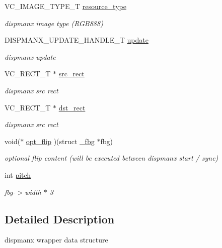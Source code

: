 \begin{DoxyCompactItemize}
V\+C\+\_\+\+I\+M\+A\+G\+E\+\_\+\+T\+Y\+P\+E\+\_\+T \hyperlink{struct__fbg__dispmanx__context_a88cb809e4e2653c6925824ebd5a66149}{resource\+\_\+type}
\begin{DoxyCompactList}\small\item\em dispmanx image type (R\+G\+B888) \end{DoxyCompactList}\item 
D\+I\+S\+P\+M\+A\+N\+X\+\_\+\+U\+P\+D\+A\+T\+E\+\_\+\+H\+A\+N\+D\+L\+E\+\_\+T \hyperlink{struct__fbg__dispmanx__context_a583202df9f959780bc21e9e5ce824f34}{update}
\begin{DoxyCompactList}\small\item\em dispmanx update \end{DoxyCompactList}\item 
V\+C\+\_\+\+R\+E\+C\+T\+\_\+T $\ast$ \hyperlink{struct__fbg__dispmanx__context_aef1016d77620bbfd67bf090fd2f08e19}{src\+\_\+rect}
\begin{DoxyCompactList}\small\item\em dispmanx src rect \end{DoxyCompactList}\item 
V\+C\+\_\+\+R\+E\+C\+T\+\_\+T $\ast$ \hyperlink{struct__fbg__dispmanx__context_ae1857220a611fd3e288cd76c6b8a5985}{dst\+\_\+rect}
\begin{DoxyCompactList}\small\item\em dispmanx src rect \end{DoxyCompactList}\item 
void($\ast$ \hyperlink{struct__fbg__dispmanx__context_a39f7c0bacaedd656908c5e2378610477}{opt\+\_\+flip} )(struct \hyperlink{struct__fbg}{\+\_\+fbg} $\ast$fbg)
\begin{DoxyCompactList}\small\item\em optional flip content (will be executed between dispmanx start / sync) \end{DoxyCompactList}\item 
int \hyperlink{struct__fbg__dispmanx__context_a7847ad38fd083df3b2a513a43f7d82b2}{pitch}
\begin{DoxyCompactList}\small\item\em fbg-\/$>$width $\ast$ 3 \end{DoxyCompactList}\end{DoxyCompactItemize}


\subsection{Detailed Description}
dispmanx wrapper data structure 

